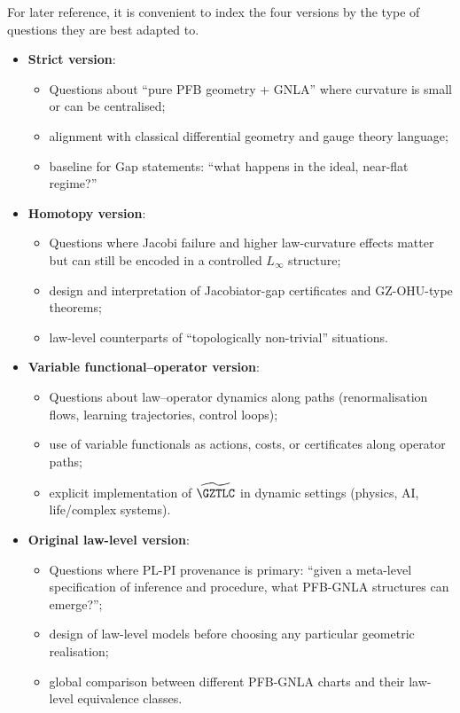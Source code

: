 \documentclass[11pt]{book}
\theoremstyle{plain}
\theoremstyle{definition}
\begin{document}
For later reference, it is convenient to index the four versions by the
type of questions they are best adapted to.

\begin{itemize}
  \item \textbf{Strict version}:
    \begin{itemize}
      \item Questions about “pure PFB geometry + GNLA” where curvature
            is small or can be centralised;
      \item alignment with classical differential geometry and gauge
            theory language;
      \item baseline for Gap statements: “what happens in the ideal,
            near-flat regime?”
    \end{itemize}
  \item \textbf{Homotopy version}:
    \begin{itemize}
      \item Questions where Jacobi failure and higher law-curvature
            effects matter but can still be encoded in a controlled
            $L_\infty$ structure;
      \item design and interpretation of Jacobiator-gap certificates
            and GZ-OHU-type theorems;
      \item law-level counterparts of “topologically non-trivial”
            situations.
    \end{itemize}
      \item \textbf{Variable functional--operator version}:
    \begin{itemize}
      \item Questions about law–operator dynamics along paths (renormalisation
            flows, learning trajectories, control loops);
      \item use of variable functionals as actions, costs, or
            certificates along operator paths;
      \item explicit implementation of $\widetilde{\GZTLC}$ in dynamic
            settings (physics, AI, life/complex systems).
    \end{itemize}
  \item \textbf{Original law-level version}:
    \begin{itemize}
      \item Questions where PL-PI provenance is primary: “given a
            meta-level specification of inference and procedure, what
            PFB-GNLA structures can emerge?”;
      \item design of law-level models before choosing any particular
            geometric realisation;
      \item global comparison between different PFB-GNLA charts and
            their law-level equivalence classes.
    \end{itemize}
\end{itemize}
\end{document}
